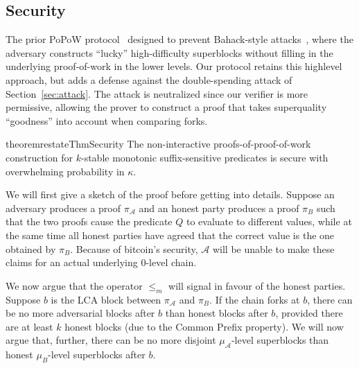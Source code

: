 \subsection{Security}

The prior PoPoW protocol~\cite{KLS} designed to prevent Bahack-style
attacks~\cite{bahack}, where the adversary constructs ``lucky'' high-difficulty
superblocks without filling in the underlying proof-of-work in the lower
levels.
Our protocol retains this highlevel approach, but adds a defense against the double-spending attack of Section~\ref{sec:attack}.
The attack is neutralized since our
verifier is more permissive, allowing the prover to construct a proof that takes superquality  ``goodness'' into account when comparing forks.


\begin{restatable}{theorem}{restateThmSecurity}
    \label{thm.security}
    The non-interactive proofs-of-proof-of-work construction for $k$-stable
    monotonic suffix-sensitive predicates is secure with overwhelming
    probability in $\kappa$.
\end{restatable}

We will first give a sketch of the proof before getting into 
details. Suppose an adversary produces a proof $\pi_\mathcal{A}$ and an honest
party produces a proof $\pi_B$ such that the two proofs cause the predicate $Q$
to evaluate to different values, while at the same time all honest parties have
agreed that the correct value is the one obtained by $\pi_B$. Because of
bitcoin's security, $\mathcal{A}$ will be unable to make these claims for an
actual underlying 0-level chain.

We now argue that the operator $\leq_m$ will
signal in favour of the honest parties.
Suppose $b$ is the LCA block between $\pi_\mathcal{A}$ and $\pi_B$. If the chain
forks at $b$, there can be no more adversarial blocks after $b$ than honest
blocks after $b$, provided there are at least $k$ honest blocks (due to the
Common Prefix property). We will now argue that, further, there can be no more
disjoint $\mu_\mathcal{A}$-level superblocks than honest $\mu_B$-level
superblocks after $b$.

